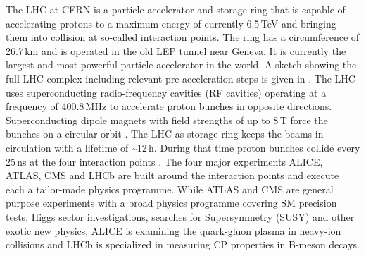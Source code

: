 The LHC at CERN is a particle accelerator and storage ring that is capable of accelerating protons to a maximum energy of currently 6.5\,{TeV} and bringing them into collision at so-called interaction points. 
The ring has a circumference of 26.7\,km and is operated in the old LEP tunnel near Geneva. 
It is currently the largest and most powerful particle accelerator in the world. 
A sketch showing the full LHC complex including relevant pre-acceleration steps is given in . 
The LHC uses superconducting radio-frequency cavities (RF cavities) operating at a frequency of 400.8\,MHz to accelerate proton bunches in opposite directions. Superconducting dipole magnets with field strengths of up to 8\,{T} force the bunches on a circular orbit \cite{lhc_machine}.
The LHC as storage ring keeps the beams in circulation with a lifetime of \sim 12\,h. During that time proton bunches collide every 25\,ns at the four interaction points \cite{lhc_machine}.
The four major experiments ALICE, ATLAS, CMS and LHCb are built around the interaction points and execute each a tailor-made physics programme. 
While ATLAS and CMS are general purpose experiments with a broad physics programme covering SM precision tests, Higgs sector investigations, searches for Supersymmetry (SUSY) and other exotic 
new physics, ALICE is examining the quark-gluon plasma in heavy-ion collisions and LHCb is specialized in measuring CP properties in B-meson decays.

